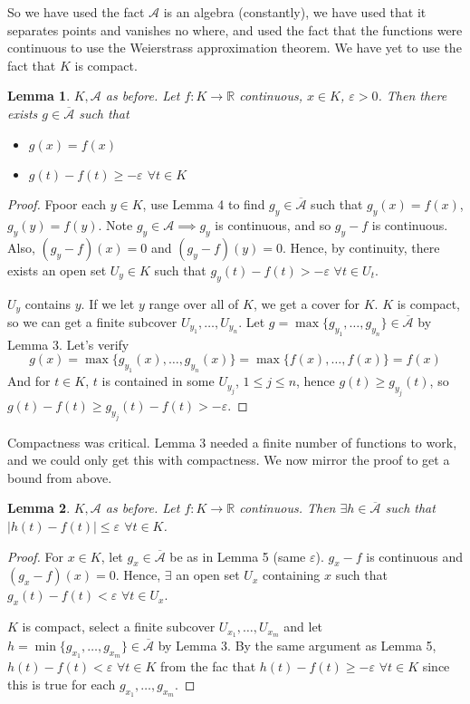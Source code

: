 \documentclass{article}
\theoremstyle{plain}
\newtheorem{lemma}{Lemma}
\theoremstyle{remark}
\newcommand{\R}{{\mathbb R}}
\newcommand{\ep}{{\varepsilon}}
\begin{document}
So we have used the fact $\mathcal{A}$ is an algebra (constantly),
we have used that it separates points and vanishes no where,
and used the fact that the functions were continuous to use the
Weierstrass approximation theorem.
We have yet to use the fact that $K$ is compact.
\begin{lemma}
	$K,\mathcal{A}$ as before.
	Let $f \colon K \to \R$ continuous, $x \in K$, $\ep > 0$.
	Then there exists $g \in \overline{\mathcal{A}}$ such that
	\begin{itemize}
		\item $g(x) = f(x)$
		\item $g(t) - f(t) \geq - \ep$ $\forall t \in K$
	\end{itemize}
\end{lemma}
\begin{proof}
	Fpoor each $y \in K$, use Lemma 4 to find $g_y \in \overline{\mathcal{A}}$
	such that $g_y(x) = f(x)$, $g_y(y) = f(y)$.
	Note $g_y \in \mathcal{A} \implies g_y$ is continuous,
	and so $g_y - f$ is continuous.
	Also, $(g_y-f)(x) = 0$ and $(g_y-f)(y) = 0$.
	Hence, by continuity, there exists an open set $U_y \in K$ such that
	$g_y(t) - f(t) > -\ep$ $\forall t \in U_t$.

	$U_y$ contains $y$. If we let $y$ range over all of $K$,
	we get a cover for $K$.
	$K$ is compact, so we can get a finite subcover $U_{y_1},\dots,U_{y_n}$.
	Let $g = \max\{g_{y_1},\dots,g_{y_n}\} \in \overline{\mathcal{A}}$ by Lemma 3.
	Let's verify
	\[
		g(x) = \max\{g_{y_1}(x),\dots,g_{y_n}(x)\}
		= \max\{f(x),\dots,f(x)\} = f(x)
	\]
	And for $t \in K$, $t$ is contained in some $U_{y_j}$, $1\leq j \leq n$,
	hence $g(t) \geq g_{y_j}(t)$, so
	$g(t) - f(t) \geq g_{y_j}(t) - f(t) > - \ep$.
\end{proof}
Compactness was critical.
Lemma 3 needed a finite number of functions to work,
and we could only get this with compactness.
We now mirror the proof to get a bound from above.
\begin{lemma}
	$K,\mathcal{A}$ as before.
	Let $f \colon K \to \R$ continuous.
	Then $\exists h \in \overline{\mathcal{A}}$ such that
	$|h(t) - f(t)| \leq \ep$ $\forall t \in K$.
\end{lemma}
\begin{proof}
	For $x \in K$, let $g_x \in \overline{\mathcal{A}}$ be as in Lemma 5 (same $\ep$).
	$g_x - f$ is continuous and $(g_x - f)(x) = 0$.
	Hence, $\exists$ an open set $U_x$ containing $x$ such that
	$g_x(t) - f(t) < \ep$ $\forall t \in U_x$.

	$K$ is compact, select a finite subcover $U_{x_1},\dots,U_{x_m}$
	and let $h = \min\{g_{x_1},\dots,g_{x_m}\} \in \overline{\mathcal{A}}$ by Lemma 3.
	By the same argument as Lemma 5, $h(t) - f(t) < \ep$ $\forall t \in K$
	from the fac that $h(t) - f(t) \geq -\ep$ $\forall t \in K$
	since this is true for each $g_{x_1},\dots,g_{x_m}$.
\end{proof}
\end{document}
